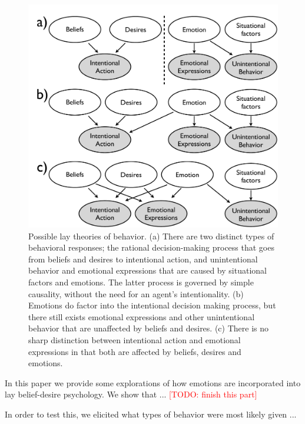 \documentclass[10pt,letterpaper]{article}
\newcommand{\red}[1]{\textcolor{Red}{#1}}
\begin{document}
\begin{figure}[htb!]
\begin{center}
\includegraphics[width=1\columnwidth]{images/model1.pdf} 
\end{center}
\caption{ Possible lay theories of behavior. (a) There are two distinct types of behavioral responses; the rational decision-making process that goes from beliefs and desires to intentional action, and unintentional behavior and emotional expressions that are caused by situational factors and emotions. The latter process is governed by simple causality, without the need for an agent's intentionality. (b) Emotions do factor into the intentional decision making process, but there still exists emotional expressions and other unintentional behavior that are unaffected by beliefs and desires. (c) There is no sharp distinction between intentional action and emotional expressions in that both are affected by beliefs, desires and emotions.  }
\label{ModelsOfBehaviorFig}
\end{figure}




In this paper we provide some explorations of how emotions are incorporated into lay belief-desire psychology. We show that ... \red{[TODO: finish this part]}




In order to test this, we elicited what types of behavior were most likely given ...
\end{document}
